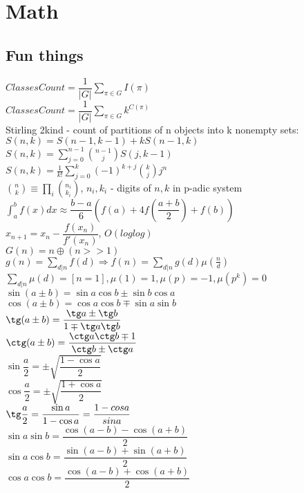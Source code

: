 \chapter{Math}

\columnbreak
{}
\columnbreak
{}
\columnbreak
{}
\columnbreak
\section{Fun things}
$ClassesCount = \dfrac{1}{|G|} \sum_{\pi \in G} I(\pi)$\\
$ClassesCount = \dfrac{1}{|G|} \sum_{\pi \in G} k^{C(\pi)}$\\
Stirling 2kind - count of partitions of n objects into k nonempty sets:\\
$S(n,k) = S(n-1,k-1) + kS(n-1,k)$\\
$S(n,k) = \sum_{j=0}^{n-1} \binom{n-1}{j}S(j,k-1)$\\
$S(n,k) = \frac{1}{k!}\sum_{j=0}^k(-1)^{k+j}\binom{k}{j}j^n$\\
$\binom{n}{k} \equiv \prod_{i}\binom{n_i}{k_i}$, $n_i, k_i$ - digits of $n,k$ in p-adic system
$\int_{a}^{b}f(x)dx \approx \dfrac{b-a}{6}(f(a) + 4f(\dfrac{a+b}
{2})+f(b))$\\
$x_{n+1} = x_n - \dfrac{f(x_n)}{f'(x_n)}$, $O(loglog)$\\
$G(n) = n \oplus (n >> 1)$\\
$g(n) = \sum_{d|n} f(d) \Rightarrow f(n) = \sum_{d|n} g(d) \mu(\frac{n}{d})$\\
$\sum_{d|n} \mu(d) = [n = 1],   \mu(1) = 1, \mu(p) = -1, \mu(p^k) = 0$\\
$\sin(a \pm b) = \sin a \cos b \pm \sin b \cos a$\\
$\cos(a \pm b) = \cos a \cos b \mp \sin a \sin b$\\
$\tg(a\pm b) = \dfrac{\tg a \pm \tg b}{1 \mp \tg a \tg b}$\\
$\ctg(a \pm b) = \dfrac{\ctg a \ctg b \mp 1}{\ctg b \pm \ctg a}$\\
$\sin \dfrac{a}{2} = \pm \sqrt{\dfrac{1-\cos a}{2}}$\\
$\cos \dfrac{a}{2} = \pm \sqrt{\dfrac{1+\cos a}{2}}$\\
$\tg \dfrac{a}{2} = \dfrac{\sin a}{1 - \cos a} = \dfrac{1 - cos a}{sin a}$\\
$\sin a \sin b = \dfrac{\cos(a-b) - \cos(a+b)}{2}$\\
$\sin a \cos b = \dfrac{\sin(a-b) + \sin(a+b)}{2}$\\
$\cos a \cos b = \dfrac{\cos(a-b) + \cos(a+b)}{2}$
